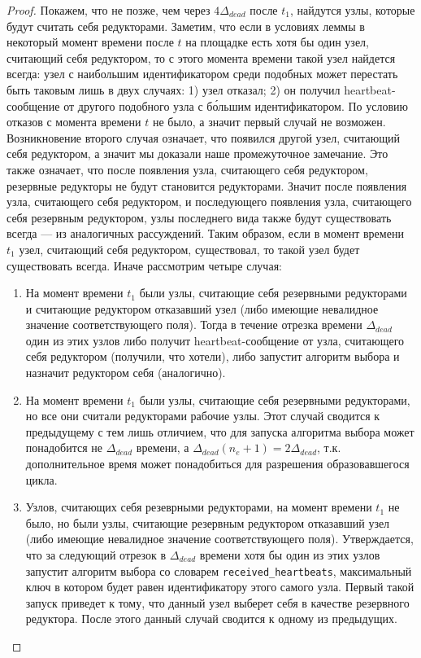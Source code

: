 \begin{proof}
    Покажем, что не позже, чем через $4\Delta_{dead}$ после $t_1$, найдутся узлы, которые будут считать себя редукторами. Заметим, что если в условиях леммы в некоторый момент времени после $t$ на площадке есть хотя бы один узел, считающий себя редуктором, то с этого момента времени такой узел найдется всегда: узел с наибольшим идентификатором среди подобных может перестать быть таковым лишь в двух случаях: 1) узел отказал; 2) он получил heartbeat-со\-об\-ще\-ние от другого подобного узла с б\'{о}льшим идентификатором. По условию отказов с момента времени $t$ не было, а значит первый случай не возможен. Возникновение второго случая означает, что появился другой узел, считающий себя редуктором, а значит мы доказали наше промежуточное замечание. Это также означает, что после появления узла, считающего себя редуктором, резервные редукторы не будут становится редукторами. Значит после появления узла, считающего себя редуктором, и последующего появления узла, считающего себя резервным редуктором, узлы последнего вида также будут существовать всегда --- из аналогичных рассуждений. Таким образом, если в момент времени $t_1$ узел, считающий себя редуктором, существовал, то такой узел будет существовать всегда. Иначе рассмотрим четыре случая:
    
    \begin{enumerate}
        \item На момент времени $t_1$ были узлы, считающие себя резервными редукторами и считающие редуктором отказавший узел (либо имеющие невалидное значение соответствующего поля). Тогда в течение отрезка времени $\Delta_{dead}$ один из этих узлов либо получит heartbeat-со\-об\-ще\-ние от узла, считающего себя редуктором (получили, что хотели), либо запустит алгоритм выбора и назначит редуктором себя (аналогично).
        
        \item На момент времени $t_1$ были узлы, считающие себя резервными редукторами, но все они считали редукторами рабочие узлы. Этот случай сводится к предыдущему с тем лишь отличием, что для запуска алгоритма выбора может понадобится не $\Delta_{dead}$ времени, а $\Delta_{dead} (n_e + 1) = 2\Delta_{dead}$, т.к. дополнительное время может понадобиться для разрешения образовавшегося цикла.
    
        \item Узлов, считающих себя резеврными редукторами, на момент времени $t_1$ не было, но были узлы, считающие резервным редуктором отказавший узел (либо имеющие невалидное значение соответствующего поля). Утверждается, что за следующий отрезок в $\Delta_{dead}$ времени хотя бы один из этих узлов запустит алгоритм выбора со словарем \texttt{received\_heartbeats}, максимальный ключ в котором будет равен идентификатору этого самого узла. Первый такой запуск приведет к тому, что данный узел выберет себя в качестве резервного редуктора. После этого данный случай сводится к одному из предыдущих.
        

\end{enumerate}
\end{proof}

